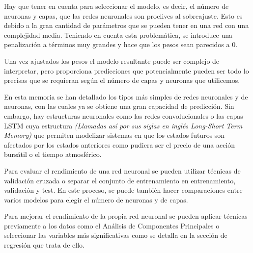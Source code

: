 \noindent Hay que tener en cuenta para seleccionar el modelo, es decir, el número de neuronas y capas, que las redes neuronales son proclives al sobreajuste. Esto es debido a la gran cantidad de parámetros que se pueden tener en una red con una complejidad media. Teniendo en cuenta esta problemática, se introduce una penalización a términos muy grandes y hace que los pesos sean parecidos a 0.

\noindent Una vez ajustados los pesos el modelo resultante puede ser complejo de interpretar, pero proporciona predicciones que potencialmente pueden ser todo lo precisas que se requieran según el número de capas y neuronas que utilicemos.  


\noindent En esta memoria se han detallado los tipos más simples de redes neuronales y de neuronas, con las cuales ya se obtiene una gran capacidad de predicción. Sin embargo, hay estructuras neuronales como las redes convolucionales o las capas LSTM cuya estructura \textit{(Llamadas así por sus siglas en inglés Long-Short Term Memory)} que permiten modelizar sistemas en que los estados futuros son afectados por los estados anteriores como pudiera ser el precio de una acción bursátil o el tiempo atmosférico.

\noindent Para evaluar el rendimiento de una red neuronal se pueden utilizar técnicas de validación cruzada o separar el conjunto de entrenamiento en entrenamiento, validación y test. 
En este proceso, se puede también hacer comparaciones entre varios modelos para elegir el número de neuronas y de capas.

\noindent Para mejorar el rendimiento de la propia red neuronal se pueden aplicar técnicas previamente a los datos como el Análisis de Componentes Principales o seleccionar las variables más significativas como se detalla en la sección de regresión que trata de ello.  
